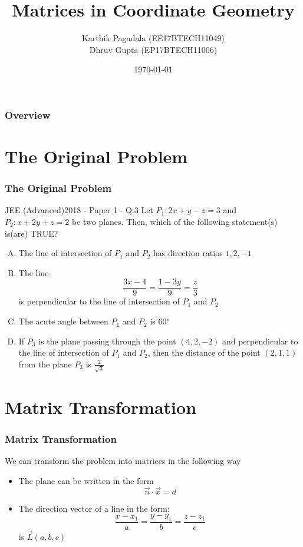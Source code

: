 \documentclass{beamer}
\title[Matrix Project]{Matrices in Coordinate Geometry}
\author{Karthik Pagadala (EE17BTECH11049)\\Dhruv Gupta (EP17BTECH11006)}
\institute[IITH] 
{
Indian Institute Of Technology Hyderabad \\
\medskip
EE1390 Matrix Project
}
\date{\today}
\begin{document}
 
\begin{frame}
\titlepage
\end{frame}
 
\begin{frame}
\frametitle{Overview}
\tableofcontents 
\end{frame}

\section{The Original Problem}
 
\begin{frame}
\frametitle{The Original Problem}
JEE (Advanced)2018 - Paper 1 - Q.3
\noindent\makebox[\linewidth]{\rule{\paperwidth}{0.4pt}}
Let $P_{1}: 2x + y - z = 3$ and $P_{2}: x + 2y + z = 2$ be two planes. Then, which of the following statement(s) is(are) TRUE?
\begin{enumerate}[(A)]
    \item The line of intersection of $P_{1}$ and $P_{2}$ has direction ratios $1,2,-1$
    \item The line
    \[
    \frac{3x-4}{9} = \frac{1-3y}{9}=\frac{z}{3}
    \]
    is perpendicular to the line of intersection of $P_{1}$ and $P_{2}$
    \item The acute angle between $P_{1}$ and $P_{2}$ is 60$^\circ$
    \item If $P_{3}$ is the plane passing through the point $(4,2,-2)$ and perpendicular to the line of intersection of $P_{1}$ and $P_{2}$, then the distance of the point $(2,1,1)$ from the plane $P_{3}$ is $\tfrac{2}{\sqrt{3}}$
\end{enumerate}
\end{frame}
 
\section{Matrix Transformation}
\begin{frame}
\frametitle{Matrix Transformation}
We can transform the problem into matrices in the following way
\begin{itemize}
\item<1-> The plane can be written in the form 
    \[
    \vec{n}\cdot\vec{x}=d
    \]
\item<2-> The direction vector of a line in the form: 
    \[
    \frac{x-x_{1}}{a}=\frac{y-y_{1}}{b}=\frac{z-z_{1}}{c}
    \] is $\vec{L}(a,b,c)$
\end{itemize}
\end{frame} 
\end{document}
